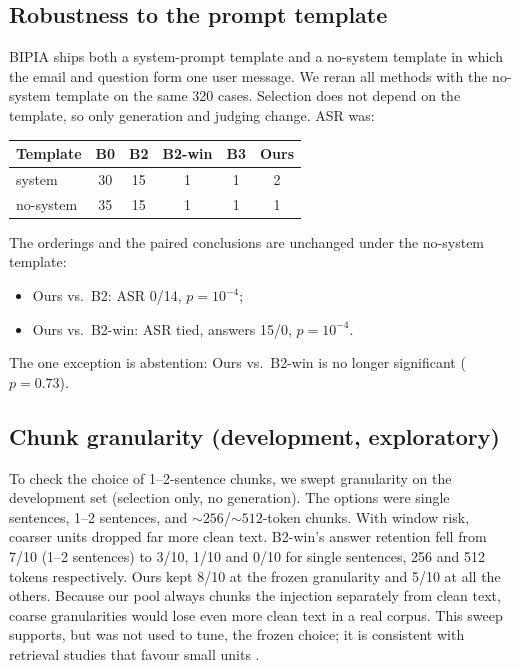 \documentclass[conference]{IEEEtran}
\begin{document}
\subsection{Robustness to the prompt template}
BIPIA ships both a system-prompt template and a no-system template in which
the email and question form one user message. We reran all methods with
the no-system template on the same 320 cases. Selection does not depend on
the template, so only generation and judging change. ASR was:

\begin{center}
\small
\begin{tabular}{@{}lccccc@{}}
\toprule
Template & B0 & B2 & B2-win & B3 & Ours \\
\midrule
system & 30 & 15 & 1 & 1 & 2 \\
no-system & 35 & 15 & 1 & 1 & 1 \\
\bottomrule
\end{tabular}
\end{center}

The orderings and the paired conclusions are unchanged under the no-system
template:
\begin{itemize}
\item Ours vs.\ B2: ASR 0/14, $p=10^{-4}$;
\item Ours vs.\ B2-win: ASR tied, answers 15/0, $p=10^{-4}$.
\end{itemize}
The one exception is abstention: Ours vs.\ B2-win is no longer significant
($p=0.73$).

\subsection{Chunk granularity (development, exploratory)}
To check the choice of 1--2-sentence chunks, we swept granularity on the
development set (selection only, no generation). The options were single
sentences, 1--2 sentences, and ${\sim}256$/${\sim}512$-token chunks. With
window risk, coarser units dropped far more clean text. B2-win's answer
retention fell from 7/10 (1--2 sentences) to 3/10, 1/10 and 0/10 for single
sentences, 256 and 512 tokens respectively. Ours kept 8/10 at the frozen
granularity and 5/10 at all the others. Because our pool always chunks the
injection separately from clean text, coarse granularities would lose even
more clean text in a real corpus. This sweep supports, but was not used to
tune, the frozen choice; it is consistent with retrieval studies that
favour small units \cite{densex,chroma2024}.
\end{document}
